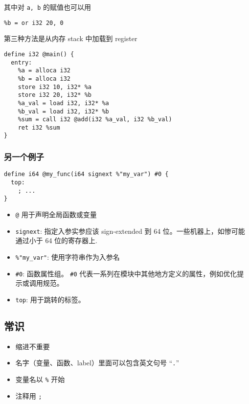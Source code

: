 其中对 \verb`a, b` 的赋值也可以用
\begin{lstlisting}[language=none]
%a = or i32 10, 0
%b = or i32 20, 0
\end{lstlisting}

第三种方法是从内存 stack 中加载到 register
\begin{lstlisting}[language=none]
define i32 @main() {
  entry:
    %a = alloca i32
    %b = alloca i32
    store i32 10, i32* %a
    store i32 20, i32* %b
    %a_val = load i32, i32* %a
    %b_val = load i32, i32* %b
    %sum = call i32 @add(i32 %a_val, i32 %b_val)
    ret i32 %sum
}
\end{lstlisting}

\subsubsection{另一个例子}
\begin{lstlisting}[language=none]
define i64 @my_func(i64 signext %"my_var") #0 {
  top:
    ; ...
}
\end{lstlisting}
\begin{itemize}
\item \verb`@` 用于声明全局函数或变量
\item \verb`signext`: 指定入参实参应该 sign-extended 到 64 位。一些机器上，如惨可能通过小于 64 位的寄存器上.
\item \verb`%"my_var"`: 使用字符串作为入参名
\item \verb`#0`: 函数属性组。 \verb`#0` 代表一系列在模块中其他地方定义的属性，例如优化提示或调用规范。
\item \verb`top`: 用于跳转的标签。
\end{itemize}

\subsection{常识}
\begin{itemize}
\item 缩进不重要
\item 名字（变量、函数、label）里面可以包含英文句号 “\verb`.`”
\item 变量名以 \verb`%` 开始
\item 注释用 \verb`;`
\end{itemize}

